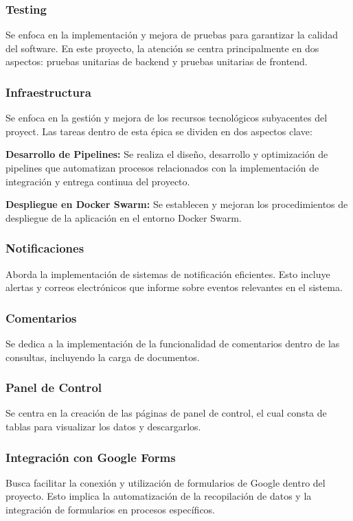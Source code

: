 \subsubsection{Testing}
Se enfoca en la implementación y mejora de pruebas para garantizar la calidad del software. En este proyecto, la atención se centra principalmente en dos aspectos: pruebas unitarias de backend y pruebas unitarias de frontend.

\subsubsection{Infraestructura}
Se enfoca en la gestión y mejora de los recursos tecnológicos subyacentes del proyect. Las tareas dentro de esta épica se dividen en dos aspectos clave:

\textbf{Desarrollo de Pipelines:} Se realiza el diseño, desarrollo y optimización de pipelines que automatizan procesos relacionados con la implementación de integración y entrega continua del proyecto.

\textbf{Despliegue en Docker Swarm:} Se establecen y mejoran los procedimientos de despliegue de la aplicación en el entorno Docker Swarm. 



\subsubsection{Notificaciones}
Aborda la implementación de sistemas de notificación eficientes. Esto incluye alertas y correos electrónicos que informe sobre eventos relevantes en el sistema.

\subsubsection{Comentarios}
Se dedica a la implementación de la funcionalidad de comentarios dentro de las consultas, incluyendo la carga de documentos.

\subsubsection{Panel de Control}
Se centra en la creación de las páginas de panel de control, el cual consta de tablas para visualizar los datos y descargarlos.

\subsubsection{Integración con Google Forms}
Busca facilitar la conexión y utilización de formularios de Google dentro del proyecto. Esto implica la automatización de la recopilación de datos y la integración de formularios en procesos específicos.

